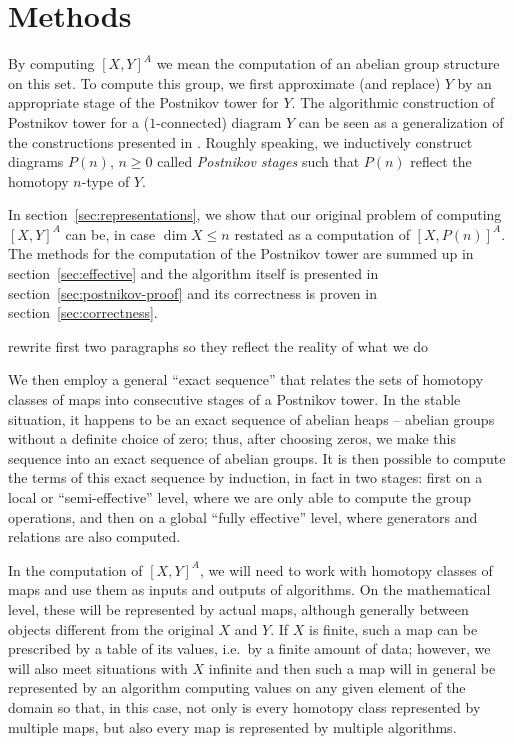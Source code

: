 \documentclass[12pt,a4wide]{article}
\theoremstyle{plain}
\theoremstyle{definition}
\newcommand{\heading}[1]{\vspace{1ex}\par\noindent{\bf\boldmath #1}}
\newcommand{\Pst}[1]{P(#1)}
\newcommand{\Pnewst}{\Pst{\then}}
\newcommand{\then}{n}
\newcommand{\thedim}{{n}}
\renewcommand\:{\colon}
\begin{document}
\section{Methods}

By computing $[X,Y]^A$ we mean the computation of an abelian group structure on this set. To compute this group, we first approximate (and replace) $Y$ by an appropriate stage of the Postnikov tower for $Y$. The algorithmic construction of Postnikov tower for a ($1$-connected) diagram $Y$ can be seen as a generalization of the constructions presented in \cite{cmk,polypost, aslep}. Roughly speaking, we inductively construct diagrams $\Pnewst$, $\thedim\geq 0$ called \emph{Postnikov stages} such that $\Pnewst$ reflect the homotopy $\thedim$-type of $Y$. 

In section~\ref{sec:representations}, we show that our original problem of computing $[X,Y]^A$ can be, in case $\dim X \leq \thedim$ restated as a computation of $[X, \Pnewst]^A$.  
The methods for the computation of the Postnikov tower are summed up in section~\ref{sec:effective} and the algorithm itself is presented in section~\ref{sec:postnikov-proof} and its correctness is proven in section~\ref{sec:correctness}.

{\color{red}rewrite first two paragraphs so they reflect the reality of what we do}

 We then  employ a general ``exact sequence'' that relates the sets of homotopy classes of maps into consecutive stages of a Postnikov tower. In the stable situation, it happens to be an exact sequence of abelian heaps -- abelian groups without a definite choice of zero; thus, after choosing zeros, we make this sequence into an exact sequence of abelian groups. It is then possible to compute the terms of this exact sequence by induction, in fact in two stages: first on a  local or ``semi-effective'' level, where we are only able to compute the group operations, and then on a global ``fully effective'' level, where generators and relations are also computed.


\heading{Representations of sets and morphisms} 

In the computation of $[X, Y]^A$, we will need to work with homotopy classes of maps and use them as inputs and outputs of algorithms. On the mathematical level, these will be represented by actual maps, although generally between objects different from the original $X$ and $Y$. If $X$ is finite, such a map can be prescribed by a table of its values, i.e.\ by a finite amount of data; however, we will also meet situations with $X$ infinite and then such a map will in general be represented by an algorithm computing values on any given element of the domain so that, in this case, not only is every homotopy class represented by multiple maps, but also every map is represented by multiple algorithms.
\end{document}
